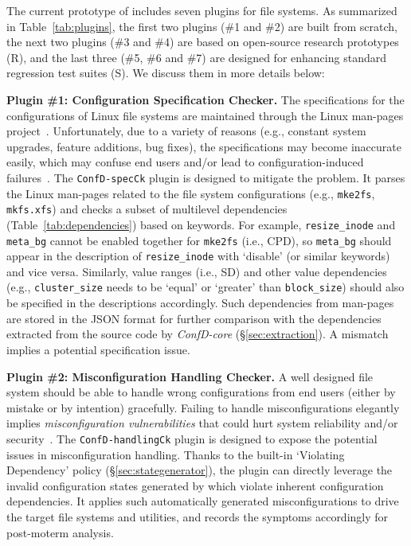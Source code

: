 The current prototype of \prj includes seven plugins for file systems.
As   summarized in Table~\ref{tab:plugins},  the first two plugins (\#1 and \#2) are built from scratch, the next two plugins  (\#3 and \#4) are based  on open-source research prototypes (R), and the last three (\#5, \#6 and \#7) are designed for enhancing standard regression test suites (S). We discuss them in more details below:  

\smallskip
\noindent
\textbf{Plugin \#1: Configuration Specification Checker.}
The specifications for the configurations of Linux file systems are maintained through the Linux man-pages project~\cite{linuxmanpage}.
Unfortunately, due to a variety of reasons (e.g., constant system upgrades, feature additions, bug fixes),  the specifications may become inaccurate easily,  which may confuse end users and/or lead to configuration-induced failures~\cite{ctest-OSDI20,maintaininglinuxmanpage}.
The \texttt{ConfD-specCk} plugin is designed to mitigate the problem. It parses the Linux man-pages related to the file system configurations (e.g., \texttt{mke2fs}, \texttt{mkfs.xfs}) and checks a subset of multilevel dependencies (Table~\ref{tab:dependencies}) based on keywords. For example, \texttt{resize\_inode} and \texttt{meta\_bg} cannot be enabled together for \texttt{mke2fs} (i.e., CPD),  so  \texttt{meta\_bg} should appear in the description of \texttt{resize\_inode} with `disable' (or similar keywords) and vice versa. Similarly,   value ranges (i.e., SD) and other value dependencies (e.g., \texttt{cluster\_size} needs to be `equal' or `greater' than \texttt{block\_size}) should also be specified in the descriptions accordingly. Such  dependencies from man-pages are stored in the JSON format for further comparison with the dependencies extracted from the source code by \textit{ConfD-core} (\S\ref{sec:extraction}). A mismatch implies a potential specification issue.

\smallskip
\noindent
\textbf{Plugin \#2: Misconfiguration Handling Checker.}
A well designed  file system should be able to handle wrong configurations  from end users (either by mistake or by intention) gracefully.
Failing to handle misconfigurations elegantly implies \textit{misconfiguration vulnerabilities}  that could hurt system reliability and/or security~\cite{spex}. 
The  \texttt{ConfD-handlingCk} plugin is designed to expose the potential issues in misconfiguration handling. 
Thanks to the built-in `Violating Dependency' policy (\S\ref{sec:stategenerator}),  the plugin can directly leverage the {invalid} configuration states generated by   \prj which violate inherent configuration dependencies. It applies such automatically generated misconfigurations to drive the target file systems and utilities, and records  the symptoms accordingly for post-moterm analysis. 

